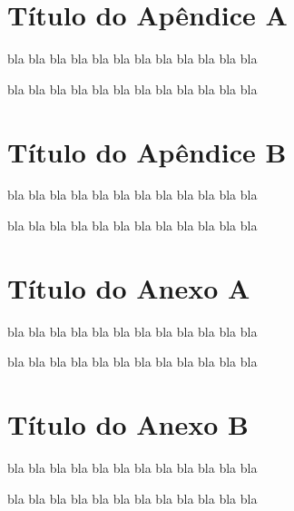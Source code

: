 \documentclass[12pt,a4paper,espaco=umemeio,noindentfirst,oneside,openany,tocpage=plain,pnumromarab,ruledheader,time,anapcustomindent]{sty/abnt}
\begin{document}

%

%
\renewcommand{\bibfile}{bib/example}
\renewcommand{\nocitebibfile}{bib/nocite}
\renewcommand{\nocitelist}{Apache,WAI}


\appendix


\chapter{Título do Apêndice A}

bla bla bla bla bla bla bla bla bla bla bla bla

bla bla bla bla bla bla bla bla bla bla bla bla


\chapter{Título do Apêndice B}

bla bla bla bla bla bla bla bla bla bla bla bla

bla bla bla bla bla bla bla bla bla bla bla bla


\annex


\chapter{Título do Anexo A}

bla bla bla bla bla bla bla bla bla bla bla bla

bla bla bla bla bla bla bla bla bla bla bla bla


\chapter{Título do Anexo B}

bla bla bla bla bla bla bla bla bla bla bla bla

bla bla bla bla bla bla bla bla bla bla bla bla

\end{document}
